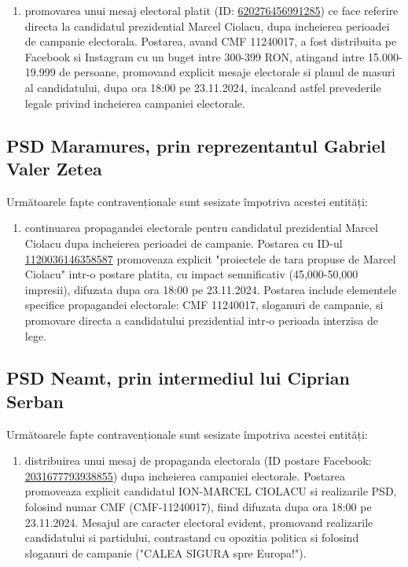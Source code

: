 \documentclass[a4paper,12pt]{article}
\begin{document}
\begin{enumerate}[leftmargin=*, label=\arabic*.)]
    \item promovarea unui mesaj electoral platit (ID: \href{https://www.facebook.com/ads/library/?id=620276456991285}{620276456991285}) ce face referire directa la candidatul prezidential Marcel Ciolacu, dupa incheierea perioadei de campanie electorala. Postarea, avand CMF 11240017, a fost distribuita pe Facebook si Instagram cu un buget intre 300-399 RON, atingand intre 15.000-19.999 de persoane, promovand explicit mesaje electorale si planul de masuri al candidatului, dupa ora 18:00 pe 23.11.2024, incalcand astfel prevederile legale privind incheierea campaniei electorale.
\end{enumerate}

\vspace{0.5cm}

\subsection{PSD Maramures, prin reprezentantul Gabriel Valer Zetea}
Următoarele fapte contravenționale sunt sesizate împotriva acestei entități:

\begin{enumerate}[leftmargin=*, label=\arabic*.)]
    \item continuarea propagandei electorale pentru candidatul prezidential Marcel Ciolacu dupa incheierea perioadei de campanie. Postarea cu ID-ul \href{https://www.facebook.com/ads/library/?id=1120036146358587}{1120036146358587} promoveaza explicit "proiectele de tara propuse de Marcel Ciolacu" intr-o postare platita, cu impact semnificativ (45,000-50,000 impresii), difuzata dupa ora 18:00 pe 23.11.2024. Postarea include elementele specifice propagandei electorale: CMF 11240017, sloganuri de campanie, si promovare directa a candidatului prezidential intr-o perioada interzisa de lege.
\end{enumerate}

\vspace{0.5cm}

\subsection{PSD Neamt, prin intermediul lui Ciprian Serban}
Următoarele fapte contravenționale sunt sesizate împotriva acestei entități:

\begin{enumerate}[leftmargin=*, label=\arabic*.)]
    \item distribuirea unui mesaj de propaganda electorala (ID postare Facebook: \href{https://www.facebook.com/ads/library/?id=2031677793938855}{2031677793938855}) dupa incheierea campaniei electorale. Postarea promoveaza explicit candidatul ION-MARCEL CIOLACU si realizarile PSD, folosind numar CMF (CMF-11240017), fiind difuzata dupa ora 18:00 pe 23.11.2024. Mesajul are caracter electoral evident, promovand realizarile candidatului si partidului, contrastand cu opozitia politica si folosind sloganuri de campanie ("CALEA SIGURA spre Europa!").
\end{enumerate}
\end{document}
